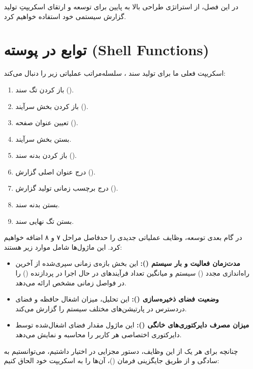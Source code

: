 در این فصل، از استراتژی طراحی بالا به پایین برای توسعه و ارتقای اسکریپتِ تولید گزارش سیستمی خود استفاده خواهیم کرد.

\section{توابع در پوسته (Shell Functions)}

اسکریپت فعلی ما برای تولید سند ، سلسله‌مراتب عملیاتی زیر را دنبال می‌کند:

\begin{enumerate}
  \item باز کردن تگ سند ().
  \item باز کردن بخش سرآیند ().
  \item تعیین عنوان صفحه ().
  \item بستن بخش سرآیند.
  \item باز کردن بدنه سند ().
  \item درج عنوان اصلی گزارش ().
  \item درج برچسب زمانی تولید گزارش ().
  \item بستن بدنه سند.
  \item بستن تگ نهایی سند.
\end{enumerate}

در گام بعدی توسعه، وظایف عملیاتی جدیدی را حدفاصل مراحل ۷ و ۸ اضافه خواهیم کرد. این ماژول‌ها شامل موارد زیر هستند:

\begin{itemize}
  \item \textbf{مدت‌زمان فعالیت و بار سیستم ():} این بخش بازه‌ی زمانی سپری‌شده از آخرین راه‌اندازی مجدد () سیستم و میانگین تعداد فرآیندهای در حال اجرا در پردازنده () را در فواصل زمانی مشخص ارائه می‌دهد.
  \item \textbf{وضعیت فضای ذخیره‌سازی ():} این تحلیل، میزان اشغال حافظه و فضای دردسترس در پارتیشن‌های مختلف سیستم را گزارش می‌کند.
  \item \textbf{میزان مصرف دایرکتوری‌های خانگی ():} این ماژول مقدار فضای اشغال‌شده توسط دایرکتوری اختصاصی هر کاربر را محاسبه و نمایش می‌دهد.
\end{itemize}

چنانچه برای هر یک از این وظایف، دستور مجزایی در اختیار داشتیم، می‌توانستیم به سادگی و از طریق جایگزینی فرمان ()، آن‌ها را به اسکریپت خود الحاق کنیم:

